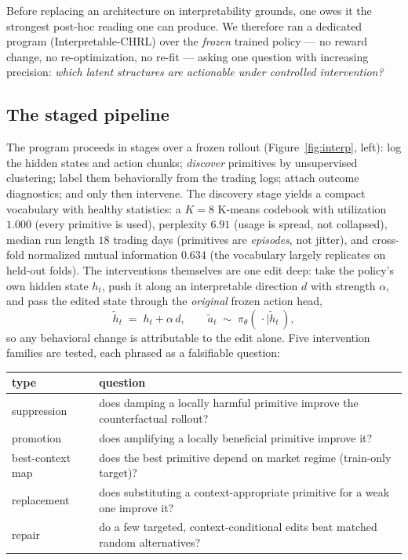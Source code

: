 \documentclass[11pt]{article}
\begin{document}
Before replacing an architecture on interpretability grounds, one owes it the strongest
post-hoc reading one can produce. We therefore ran a dedicated program (Interpretable-CHRL)
over the \emph{frozen} trained policy --- no reward change, no re-optimization, no re-fit ---
asking one question with increasing precision: \emph{which latent structures are actionable
under controlled intervention?}

\subsection{The staged pipeline}
\label{sec:stages}

The program proceeds in stages over a frozen rollout (Figure~\ref{fig:interp}, left): log the
hidden states and action chunks; \emph{discover} primitives by unsupervised clustering; label
them behaviorally from the trading logs; attach outcome diagnostics; and only then intervene.
The discovery stage yields a compact vocabulary with healthy statistics: a $K{=}8$ K-means
codebook with utilization $1.000$ (every primitive is used), perplexity $6.91$ (usage is
spread, not collapsed), median run length $18$ trading days (primitives are \emph{episodes},
not jitter), and cross-fold normalized mutual information $0.634$ (the vocabulary largely
replicates on held-out folds). The interventions themselves are one edit deep: take the
policy's own hidden state $h_t$, push it along an interpretable direction $d$ with strength
$\alpha$, and pass the edited state through the \emph{original} frozen action head,
\begin{equation}
\tilde h_t \;=\; h_t + \alpha\, d, \qquad
\tilde a_t \;\sim\; \pi_\theta(\,\cdot \mid \tilde h_t\,),
\label{eq:intervene}
\end{equation}
so any behavioral change is attributable to the edit alone. Five intervention families are
tested, each phrased as a falsifiable question:
\begin{center}\small
\begin{tabular}{lp{10.2cm}}
\toprule
type & question \\
\midrule
suppression & does damping a locally harmful primitive improve the counterfactual rollout? \\
promotion & does amplifying a locally beneficial primitive improve it? \\
best-context map & does the best primitive depend on market regime (train-only target)? \\
replacement & does substituting a context-appropriate primitive for a weak one improve it? \\
repair & do a few targeted, context-conditional edits beat matched random alternatives? \\
\bottomrule
\end{tabular}
\end{center}
\end{document}
